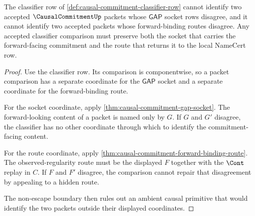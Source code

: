 \begin{theorem}
\label{thm:causal-commitment-classifier-coherence}
The classifier row of \autoref{def:causal-commitment-classifier-row} cannot identify two accepted $\CausalCommitmentUp$ packets whose $\mathsf{GAP}$ socket rows disagree, and it cannot identify two accepted packets whose forward-binding routes disagree. Any accepted classifier comparison must preserve both the socket that carries the forward-facing commitment and the route that returns it to the local NameCert row.
\end{theorem}
\begin{proof}
Use the classifier row. Its comparison is componentwise, so a packet comparison has a separate coordinate for the $\mathsf{GAP}$ socket and a separate coordinate for the forward-binding route.

For the socket coordinate, apply \autoref{thm:causal-commitment-gap-socket}. The forward-looking content of a packet is named only by $G$. If $G$ and $G'$ disagree, the classifier has no other coordinate through which to identify the commitment-facing content.

For the route coordinate, apply \autoref{thm:causal-commitment-forward-binding-route}. The observed-regularity route must be the displayed $F$ together with the $\Cont$ replay in $C$. If $F$ and $F'$ disagree, the comparison cannot repair that disagreement by appealing to a hidden route.

The non-escape boundary then rules out an ambient causal primitive that would identify the two packets outside their displayed coordinates.
\end{proof}

